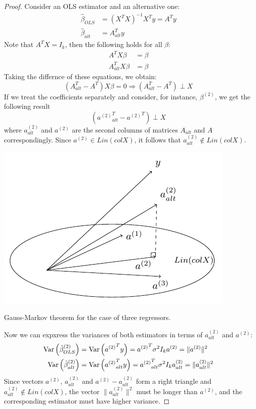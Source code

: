 \begin{proof}
Consider an OLS estimator and an alternative one:
\begin{align*}
\hat{\beta}_{OLS} &= (X^T X)^{-1} X^T y = A^T y \\
\hat{\beta}_{alt} &= A^T_{alt} y
\end{align*}
Note that $A^T X = I_{k}$, then the following holds for all $\beta$:
\begin{align*}
A^T X \beta &= \beta \\
A^T_{alt} X \beta &= \beta
\end{align*}
Taking the differnce of these equations, we obtain:
\[
(A^T_{alt} - A^T) X \beta = 0 \Rightarrow (A^T_{alt} - A^T) \perp X
\]
If we treat the coefficients separately and consider, for instance, $\beta^{(2)}$,
we get the following result
\[
({a^{(2)}}^T_{alt} - {a^{(2)}}^T) \perp X
\]
where $a^{(2)}_{alt}$ and $a^{(2)}$ are the second columns of matrices
$A_{alt}$ and $A$ correspondingly.
Since $a^{(2)} \in Lin(col X)$, it follows that $a^{(2)}_{alt} \not \in Lin(col X)$.

\begin{marginfigure}[3\baselineskip]
\includegraphics[scale=0.7]{figures/02_gmt.pdf}
\label{fig:gmt}
\caption{Gauss-Markov theorem for the case of three regressors.}
\end{marginfigure}

Now we can expxress the variances of both estimators in terms of $a^{(2)}_{alt}$ and $a^{(2)}$:
\begin{align*}
\operatorname{Var}\left(\hat{\beta}^{(2)}_{OLS}\right) &= \operatorname{Var}\left({a^{(2)}}^T y\right) = {a^{(2)}}^T \sigma^2 I_{k} a^{(2)} = \lVert a^{(2)} \rVert^2 \\
\operatorname{Var}\left(\hat{\beta}^{(2)}_{alt}\right) &= \operatorname{Var}\left({a^{(2)}}^T_{alt} y\right) =  {a^{(2)}}^T_{alt} \sigma^2 I_{k} a^{(2)}_{alt} = \lVert a_{alt}^{(2)} \rVert^2
\end{align*}
Since vectors $a^{(2)}$, $a^{(2)}_{alt}$ and $a^{(2)} - a^{(2)}_{alt}$
form a right triangle and $a^{(2)}_{alt} \not \in Lin(col X)$,
the vector $\lVert a_{alt}^{(2)} \rVert^2$ must be longer than $a^{(2)}$,
and the corresponding estimator must have higher variance.

\end{proof}
